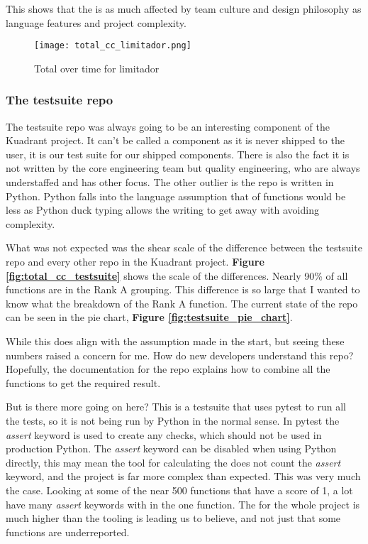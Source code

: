 This shows that the \cc is as much affected by team culture and design philosophy as language features and project complexity.

\begin{figure}
	\texttt{[image: total\_cc\_limitador.png]}
	\caption{Total \cc over time for limitador}
	\label{fig:total_cc_limitador}
\end{figure}

\subsubsection{The testsuite repo}
The testsuite repo was always going to be an interesting component of the Kuadrant project.
It can't be called a component as it is never shipped to the user, it is our test suite for our shipped components.
There is also the fact it is not written by the core engineering team but quality engineering, who are always understaffed and has other focus.
The other outlier is the repo is written in Python.
Python falls into the language assumption that \cc of functions would be less as Python duck typing allows the writing to get away with avoiding complexity.

What was not expected was the shear scale of the difference between the testsuite repo and every other repo in the Kuadrant project.
\textbf{Figure \ref{fig:total_cc_testsuite}} shows the scale of the differences.
Nearly 90\% of all functions are in the Rank A grouping.
This difference is so large that I wanted to know what the breakdown of the Rank A function.
The current state of the repo can be seen in the pie chart, \textbf{Figure \ref{fig:testsuite_pie_chart}}.

While this does align with the assumption made in the start, but seeing these numbers raised a concern for me.
How do new developers understand this repo?
Hopefully, the documentation for the repo explains how to combine all the functions to get the required result.

But is there more going on here?
This is a testsuite that uses pytest to run all the tests, so it is not being run by Python in the normal sense.
In pytest the \textit{assert} keyword is used to create any checks, which should not be used in production Python.
The \textit{assert} keyword can be disabled when using Python directly, this may mean the tool for calculating the \cc does not count the \textit{assert} keyword, and the project is far more complex than expected.
This was very much the case.
Looking at some of the near 500 functions that have a \cc score of 1, a lot have many \textit{assert} keywords with in the one function.
The \cc for the whole project is much higher than the tooling is leading us to believe, and not just that some functions are underreported.

